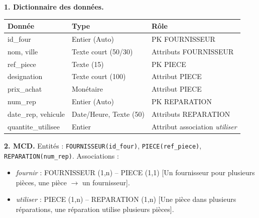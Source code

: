 \documentclass[11pt]{article}
\begin{document}
\begin{corrige}
\textbf{1. Dictionnaire des données.}
\begin{center}
\begin{tabularx}{\linewidth}{|l|l|X|}
\hline
\rowcolor{popblueL} \textbf{Donnée} & \textbf{Type} & \textbf{Rôle} \\
\hline
id\_four & Entier (Auto) & PK FOURNISSEUR \\
\hline
nom, ville & Texte court (50/30) & Attributs FOURNISSEUR \\
\hline
ref\_piece & Texte (15) & PK PIECE \\
\hline
designation & Texte court (100) & Attribut PIECE \\
\hline
prix\_achat & Monétaire & Attribut PIECE \\
\hline
num\_rep & Entier (Auto) & PK REPARATION \\
\hline
date\_rep, vehicule & Date/Heure, Texte (50) & Attributs REPARATION \\
\hline
quantite\_utilisee & Entier & Attribut association \emph{utiliser} \\
\hline
\end{tabularx}
\end{center}

\textbf{2. MCD.}
Entités : \texttt{FOURNISSEUR(id\_four)}, \texttt{PIECE(ref\_piece)}, \texttt{REPARATION(num\_rep)}.
Associations :
\begin{itemize}
\item \emph{fournir} : FOURNISSEUR (1,n) -- PIECE (1,1) [Un fournisseur pour plusieurs pièces, une pièce $\to$ un fournisseur].
\item \emph{utiliser} : PIECE (1,n) -- REPARATION (1,n) [Une pièce dans plusieurs réparations, une réparation utilise plusieurs pièces].
\end{itemize}


\end{corrige}
\end{document}
